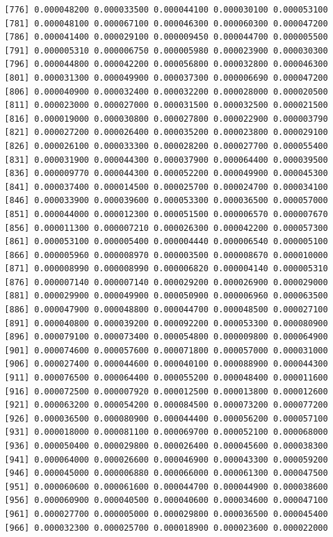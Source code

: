 \documentclass[]{article}
\begin{document}
\begin{verbatim}
  [776] 0.000048200 0.000033500 0.000044100 0.000030100 0.000053100
  [781] 0.000048100 0.000067100 0.000046300 0.000060300 0.000047200
  [786] 0.000041400 0.000029100 0.000009450 0.000044700 0.000005500
  [791] 0.000005310 0.000006750 0.000005980 0.000023900 0.000030300
  [796] 0.000044800 0.000042200 0.000056800 0.000032800 0.000046300
  [801] 0.000031300 0.000049900 0.000037300 0.000006690 0.000047200
  [806] 0.000040900 0.000032400 0.000032200 0.000028000 0.000020500
  [811] 0.000023000 0.000027000 0.000031500 0.000032500 0.000021500
  [816] 0.000019000 0.000030800 0.000027800 0.000022900 0.000003790
  [821] 0.000027200 0.000026400 0.000035200 0.000023800 0.000029100
  [826] 0.000026100 0.000033300 0.000028200 0.000027700 0.000055400
  [831] 0.000031900 0.000044300 0.000037900 0.000064400 0.000039500
  [836] 0.000009770 0.000044300 0.000052200 0.000049900 0.000045300
  [841] 0.000037400 0.000014500 0.000025700 0.000024700 0.000034100
  [846] 0.000033900 0.000039600 0.000053300 0.000036500 0.000057000
  [851] 0.000044000 0.000012300 0.000051500 0.000006570 0.000007670
  [856] 0.000011300 0.000007210 0.000026300 0.000042200 0.000057300
  [861] 0.000053100 0.000005400 0.000004440 0.000006540 0.000005100
  [866] 0.000005960 0.000008970 0.000003500 0.000008670 0.000010000
  [871] 0.000008990 0.000008990 0.000006820 0.000004140 0.000005310
  [876] 0.000007140 0.000007140 0.000029200 0.000026900 0.000029000
  [881] 0.000029900 0.000049900 0.000050900 0.000006960 0.000063500
  [886] 0.000047900 0.000048800 0.000044700 0.000048500 0.000027100
  [891] 0.000040800 0.000039200 0.000092200 0.000053300 0.000080900
  [896] 0.000079100 0.000073400 0.000054800 0.000009800 0.000064900
  [901] 0.000074600 0.000057600 0.000071800 0.000057000 0.000031000
  [906] 0.000027400 0.000044600 0.000040100 0.000088900 0.000044300
  [911] 0.000076500 0.000064400 0.000055200 0.000048400 0.000011600
  [916] 0.000072500 0.000007920 0.000012500 0.000013800 0.000012600
  [921] 0.000063200 0.000054200 0.000084500 0.000073200 0.000077200
  [926] 0.000036500 0.000080900 0.000044400 0.000056200 0.000057100
  [931] 0.000018000 0.000081100 0.000069700 0.000052100 0.000068000
  [936] 0.000050400 0.000029800 0.000026400 0.000045600 0.000038300
  [941] 0.000064000 0.000026600 0.000046900 0.000043300 0.000059200
  [946] 0.000045000 0.000006880 0.000066000 0.000061300 0.000047500
  [951] 0.000060600 0.000061600 0.000044700 0.000044900 0.000038600
  [956] 0.000060900 0.000040500 0.000040600 0.000034600 0.000047100
  [961] 0.000027700 0.000005000 0.000029800 0.000036500 0.000045400
  [966] 0.000032300 0.000025700 0.000018900 0.000023600 0.000022000

\end{verbatim}
\end{document}
